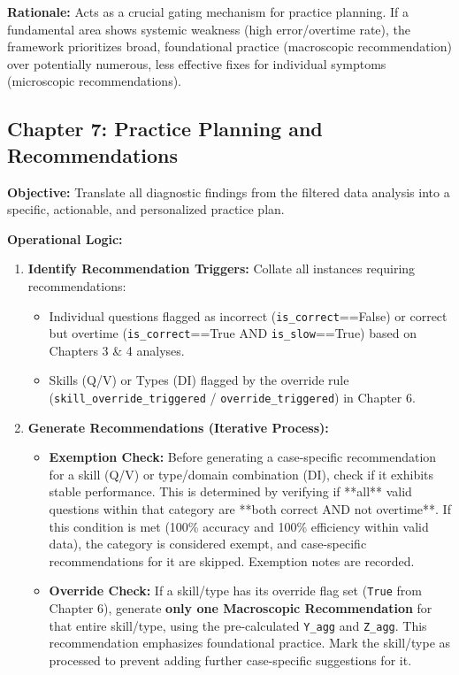 \documentclass{article}
\begin{document}
\textbf{Rationale:} Acts as a crucial gating mechanism for practice planning. If a fundamental area shows systemic weakness (high error/overtime rate), the framework prioritizes broad, foundational practice (macroscopic recommendation) over potentially numerous, less effective fixes for individual symptoms (microscopic recommendations).

\subsection{Chapter 7: Practice Planning and Recommendations}

\textbf{Objective:} Translate all diagnostic findings from the filtered data analysis into a specific, actionable, and personalized practice plan.

\textbf{Operational Logic:}
\begin{enumerate}
    \item \textbf{Identify Recommendation Triggers:} Collate all instances requiring recommendations:
    \begin{itemize}
        \item Individual questions flagged as incorrect (\texttt{is\_correct}==False) or correct but overtime (\texttt{is\_correct}==True AND \texttt{is\_slow}==True) based on Chapters 3 \& 4 analyses.
        \item Skills (Q/V) or Types (DI) flagged by the override rule (\texttt{skill\_override\_triggered} / \texttt{override\_triggered}) in Chapter 6.
    \end{itemize}
    \item \textbf{Generate Recommendations (Iterative Process):}
    \begin{itemize}
        \item \textbf{Exemption Check:} Before generating a case-specific recommendation for a skill (Q/V) or type/domain combination (DI), check if it exhibits stable performance. This is determined by verifying if **all** valid questions within that category are **both correct AND not overtime**. If this condition is met (100\% accuracy and 100\% efficiency within valid data), the category is considered exempt, and case-specific recommendations for it are skipped. Exemption notes are recorded.
        \item \textbf{Override Check:} If a skill/type has its override flag set (\texttt{True} from Chapter 6), generate \textbf{only one Macroscopic Recommendation} for that entire skill/type, using the pre-calculated \texttt{Y\_agg} and \texttt{Z\_agg}. This recommendation emphasizes foundational practice. Mark the skill/type as processed to prevent adding further case-specific suggestions for it.

\end{itemize}
\end{enumerate}
\end{document}
